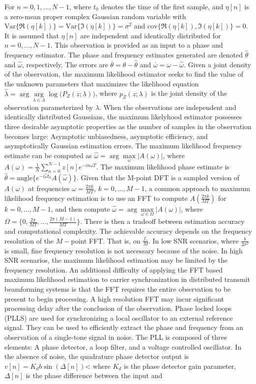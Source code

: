 \documentclass{article}
\theoremstyle{mystyle}
\begin{document}
For $n=0,1,\hdots, N-1$, where $t_0$ denotes the time of the first sample, and $\eta[n]$ is a zero-mean proper complex Gaussian random variable with $\textrm{Var}\{\Re(\eta[k])\} = \textrm{Var}\{\Im(\eta[k])\} =\sigma^2$ and $\textrm{cov}\{\Re(\eta[k]),\Im(\eta[k])\} = 0$. It is assumed that $\eta[n]$ are independent and identically distributed for $n=0,\hdots, N-1$. This observation is provided as an input to a phase and frequency estimator. The phase and frequency estimates generated are denoted $\hat{\theta}$ and $\hat{\omega}$, respectively. The errors are $\overline{\theta} = \theta - \hat{\theta}$ and $\overline{\omega} = \omega - \hat{\omega}$. Given a joint density of the observation, the maximum likelihood estimator seeks to find the value of the unknown parameters that maximizes the likelihood equation $\hat{\lambda} = \arg \underset{\lambda \in \Lambda}\arg \log\big(P_{Z}(z;\lambda)\big)$, where $p_{Z}(z;\lambda)$ is the joint density of the observation parameterized by $\lambda$. When the observations are independent and identically distributed Gaussians, the maximum likelyhood estimator possesses three desirable asymptotic properties as the number of samples in the observation becomes large: Asymptotic unbiasedness, asymptotic efficiency, and asymptotically Gaussian estimation errors. The maximum likelihood frequency estimate can be computed as $\hat{\omega} = \arg\underset{\omega}\max|A(\omega)|$, where $A(\omega) = \frac{1}{N}\sum_{n=0}^{N-1}z[n]e^{-in\omega T}$. The maximum likelihood phase estimate is $\hat{\theta} = \textrm{angle}\{e^{-i\hat{\omega}t_{0}}A(\hat{\omega})\}$. Given that the M-point DFT is a sampled version of $A(\omega)$ at frequencies $\omega = \frac{2\pi k}{MT}$, $k=0,\hdots, M-1$, a common approach to maximum likelihood frequency estimation is to use an FFT to compute $A(\frac{2\pi k}{MT})$ for $k=0,\hdots, M-1$, and then compute $\hat{\omega} = \arg\underset{\omega \in \Omega}\max |A(\omega)|$, where $\Omega = \{0,\frac{2\pi}{MT},\hdots, \frac{2\pi(M-1)}{MT}\}$. There is then a tradeoff between estimation accuracy and computational complexity. The achievable accuracy depends on the frequency resolution of the $M-$point FFT. That is, on $\frac{f_{s}}{M}$. In low SNR scenarios, where $\frac{b}{2\sigma^2}$ is small, fine frequency resolution is not necessary because of the noise. In high SNR scenarios, the maximum likelihood estimation may be limited by the frequency resolution. An additional difficulty of applying the FFT based maximum likelihood estimation to carrier synchronization in distributed transmit beamforming systems is that the FFT requires the entire observation to be present to begin processing. A high resolution FFT may incur significant processing delay after the conclusion of the observation. Phase locked loops (PLLS) are used for synchronizing a local oscillator to an external reference signal. They can be used to efficiently extract the phase and frequency from an observation of a single-tone signal in noise. The PLL is composed of three elements: A phase detector, a loop filter, and a voltage controlled oscillator. In the absence of noise, the quadrature phase detector output is $v[n] = K_{d}b\sin(\Delta[n])$< where $K_{d}$ is the phase detector gain parameter, $\Delta[n]$ is the phase difference between the input and 
\end{document}

